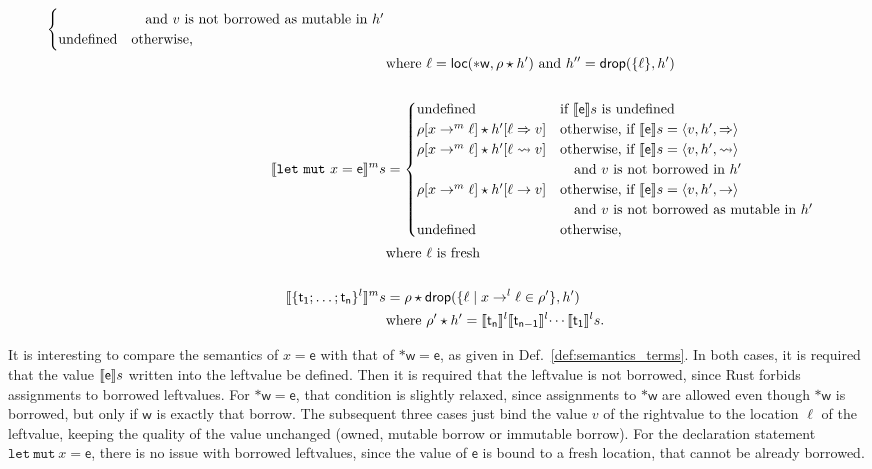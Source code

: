 \begin{definition}
\begin{align*}
\begin{cases}
      &\quad\text{and $v$ is not borrowed as mutable in $h'$}\\
      \text{undefined} & \text{otherwise,}
    \end{cases}\\
    &\text{where $\ell=\loc(*\mathsf{w},\rho\star h')$ and $h''=\drop(\{\ell\},h')$}\\
    \mbox{}\\
    \denl[\mathtt{let\ mut}\ x=\mathsf{e}]{m}{s}&=
    \begin{cases}
      \text{undefined} & \text{if $\den[\mathsf{e}]{s}$ is undefined}\\
      \rho[x\to^m\ell]\star h'[\ell\Rightarrow v] & \text{otherwise, if $\den[\mathsf{e}]{s}=\langle v,h',\Rightarrow\rangle$}\\
      \rho[x\to^m\ell]\star h'[\ell\leadsto v] & \text{otherwise, if $\den[\mathsf{e}]{s}=\langle v,h',\leadsto\rangle$}\\
      & \quad\text{and $v$ is not borrowed in $h'$}\\
      \rho[x\to^m\ell]\star h'[\ell\to v] & \text{otherwise, if $\den[\mathsf{e}]{s}=\langle v,h',\to\rangle$}\\
      &\quad\text{and $v$ is not borrowed as mutable in $h'$}\\
      \text{undefined} & \text{otherwise,}
    \end{cases}\\
    &\text{where $\ell$ is fresh}\\
    \mbox{}\\
    \denl[\{\mathsf{t_1};\ldots;\mathsf{t_n}\}^l]{m}{s}&=\rho\star\drop(\{\ell\mid x\to^l\ell\in\rho'\},h')\\
    &\text{where $\rho'\star h'=\denl[\mathsf{t_n}]{l}{\denl[\mathsf{t_{n-1}}]{l}{\cdots\denl[\mathsf{t_1}]{l}{s}}}$.}
  \end{align*}
\end{definition}

\noindent
It is interesting to compare the semantics of $x=\mathsf{e}$ with that of
$*\mathsf{w}=\mathsf{e}$, as given in Def.~\ref{def:semantics_terms}.
In both cases, it is required that the value $\den[\mathsf{e}]{s}$ written into the
leftvalue be defined. Then it is required that the leftvalue is not borrowed, since Rust
forbids assignments to borrowed leftvalues. For $*\mathsf{w}=\mathsf{e}$,
that condition is slightly relaxed, since assignments to $*\mathsf{w}$ are
allowed even though $*\mathsf{w}$ is borrowed, but only if $\mathsf{w}$ is exactly that borrow.
The subsequent three cases just bind the value $v$ of the rightvalue to the location $\ell$
of the leftvalue, keeping the quality of the value unchanged (owned, mutable borrow
or immutable borrow). For the declaration statement $\mathtt{let\ mut}\ x=\mathsf{e}$,
there is no issue with borrowed leftvalues, since the value of $\mathsf{e}$ is bound to a fresh
location, that cannot be already borrowed.

